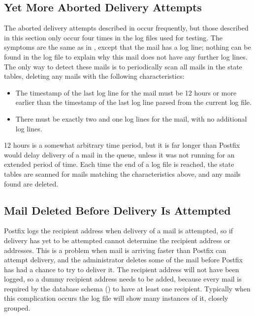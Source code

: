 \subsection{Yet More Aborted Delivery Attempts}

\label{yet more aborted delivery attempts}

The aborted delivery attempts described in  occur frequently, but those described in this section only occur
four times in the \numberOFlogFILES{} log files used for testing.  The
symptoms are the same as in , except
that the mail has a  log line; nothing can be found in the
log file to explain why this mail does not have any further log lines.  The
only way to detect these mails is to periodically scan all mails in the
state tables, deleting any mails with the following characteristics:

\begin{itemize}

    \item The timestamp of the last log line for the mail must be 12 hours
        or more earlier than the timestamp of the last log line parsed from
        the current log file.

    \item There must be exactly two  and one 
        log lines for the mail, with no additional log lines.

\end{itemize}

12 hours is a somewhat arbitrary time period, but it is far longer than
Postfix would delay delivery of a mail in the queue, unless it was not
running for an extended period of time.  Each time the end of a log file is
reached, the state tables are scanned for mails matching the
characteristics above, and any mails found are deleted.

\subsection{Mail Deleted Before Delivery Is Attempted}

\label{Mail deleted before delivery is attempted}

Postfix logs the recipient address when delivery of a mail is attempted, so
if delivery has yet to be attempted \parsername{} cannot determine the
recipient address or addresses.  This is a problem when mail is arriving
faster than Postfix can attempt delivery, and the administrator deletes
some of the mail before Postfix has had a chance to try to deliver it.  The
recipient address will not have been logged, so a dummy recipient address
needs to be added, because every mail is required by the database schema
() to have at least one recipient.  Typically
when this complication occurs the log file will show many instances of it,
closely grouped.

